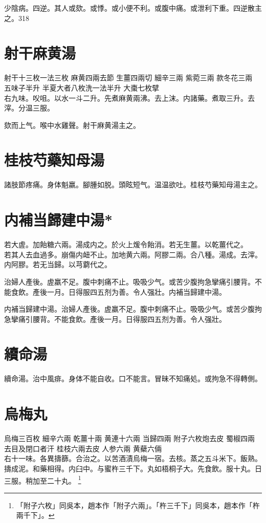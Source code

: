 少陰病。四逆。其人或欬。或悸。或小便不利。或腹中痛。或泄利下重。四逆散主之。318

\section{射干麻黄湯}

射干{\scriptsize 十三枚一法三枚} 麻黄{\scriptsize 四兩去節} 生薑{\scriptsize 四兩切} 細辛{\scriptsize 三兩} 紫菀{\scriptsize 三兩} 款冬花{\scriptsize 三兩} 五味子{\scriptsize 半升} 半夏{\scriptsize 大者八枚洗一法半升} 大棗{\scriptsize 七枚擘}\\
右九味。㕮咀。以水一斗二升。先煮麻黄兩沸。去上沫。内諸藥。煮取三升。去滓。分温三服。

欬而上气。喉中水雞聲。射干麻黄湯主之。

\section{桂枝芍藥知母湯}

諸肢節疼痛。身体魁羸。腳腫如脱。頭眩短气。温温欲吐。桂枝芍藥知母湯主之。

\section{内補当歸建中湯*}

若大虗。加飴糖六兩。湯成内之。於火上煖令飴消。若无生薑。以乾薑代之。\\
若其人去血過多。崩傷内衄不止。加地黄六兩。阿膠二兩。合八種。湯成。去滓。内阿膠。若无当歸。以芎藭代之。

治婦人產後。虗羸不足。腹中刺痛不止。吸吸少气。或苦少腹拘急攣痛引腰背。不能食飲。產後一月。日得服四五剂为善。令人强壯。内補当歸建中湯。{\wuben}

内補当歸建中湯。治婦人產後。虗羸不足。腹中刺痛不止。吸吸少气。或苦少腹拘急攣痛引腰背。不能食飲。產後一月。日得服四五剂为善。令人强壯。{\dengben}

\section{續命湯}

續命湯。治中風痱。身体不能自收。口不能言。冒昧不知痛処。或拘急不得轉側。

\section{烏梅丸}

烏梅{\scriptsize 三百枚} 細辛{\scriptsize 六兩} 乾薑{\scriptsize 十兩} 黄連{\scriptsize 十六兩} 当歸{\scriptsize 四兩} 附子{\scriptsize 六枚炮去皮} 蜀椒{\scriptsize 四兩去目及閉口者汗} 桂枝{\scriptsize 六兩去皮} 人参{\scriptsize 六兩} 黄蘗{\scriptsize 六倆}\\
右十一味。{\khaaitp 各}異擣篩。合治之。以苦酒漬烏梅一宿。去核。蒸之五斗米下。飯熟。擣成泥。和藥相得。内臼中。与蜜杵三千下。丸如梧桐子大。先食飲。服十丸。日三服。稍加{\khaaitp 至}二十丸。
	\footnote{
		「附子六枚」同吳本，趙本作「附子六兩」。「杵三千下」同吳本，趙本作「杵兩千下」。
	}

